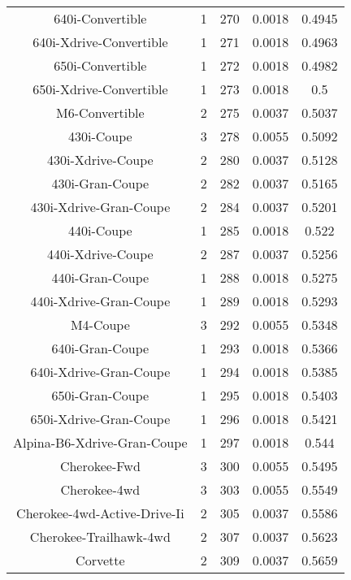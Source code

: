 \begin{center}
\begin{tabular}{|c|c|c|c|@{}c@{}|}
640i-Convertible & 1 & 270 & 0.0018 & 0.4945 \\ 
640i-Xdrive-Convertible & 1 & 271 & 0.0018 & 0.4963 \\ 
650i-Convertible & 1 & 272 & 0.0018 & 0.4982 \\ 
650i-Xdrive-Convertible & 1 & 273 & 0.0018 & 0.5 \\ 
M6-Convertible & 2 & 275 & 0.0037 & 0.5037 \\ 
430i-Coupe & 3 & 278 & 0.0055 & 0.5092 \\ 
430i-Xdrive-Coupe & 2 & 280 & 0.0037 & 0.5128 \\ 
430i-Gran-Coupe & 2 & 282 & 0.0037 & 0.5165 \\ 
430i-Xdrive-Gran-Coupe & 2 & 284 & 0.0037 & 0.5201 \\ 
440i-Coupe & 1 & 285 & 0.0018 & 0.522 \\ 
440i-Xdrive-Coupe & 2 & 287 & 0.0037 & 0.5256 \\ 
440i-Gran-Coupe & 1 & 288 & 0.0018 & 0.5275 \\ 
440i-Xdrive-Gran-Coupe & 1 & 289 & 0.0018 & 0.5293 \\ 
M4-Coupe & 3 & 292 & 0.0055 & 0.5348 \\ 
640i-Gran-Coupe & 1 & 293 & 0.0018 & 0.5366 \\ 
640i-Xdrive-Gran-Coupe & 1 & 294 & 0.0018 & 0.5385 \\ 
650i-Gran-Coupe & 1 & 295 & 0.0018 & 0.5403 \\ 
650i-Xdrive-Gran-Coupe & 1 & 296 & 0.0018 & 0.5421 \\ 
Alpina-B6-Xdrive-Gran-Coupe & 1 & 297 & 0.0018 & 0.544 \\ 
Cherokee-Fwd & 3 & 300 & 0.0055 & 0.5495 \\ 
Cherokee-4wd & 3 & 303 & 0.0055 & 0.5549 \\ 
Cherokee-4wd-Active-Drive-Ii & 2 & 305 & 0.0037 & 0.5586 \\ 
Cherokee-Trailhawk-4wd & 2 & 307 & 0.0037 & 0.5623 \\ 
Corvette & 2 & 309 & 0.0037 & 0.5659 \\ 
\hline
\end{tabular}
\end{center} \vfill

